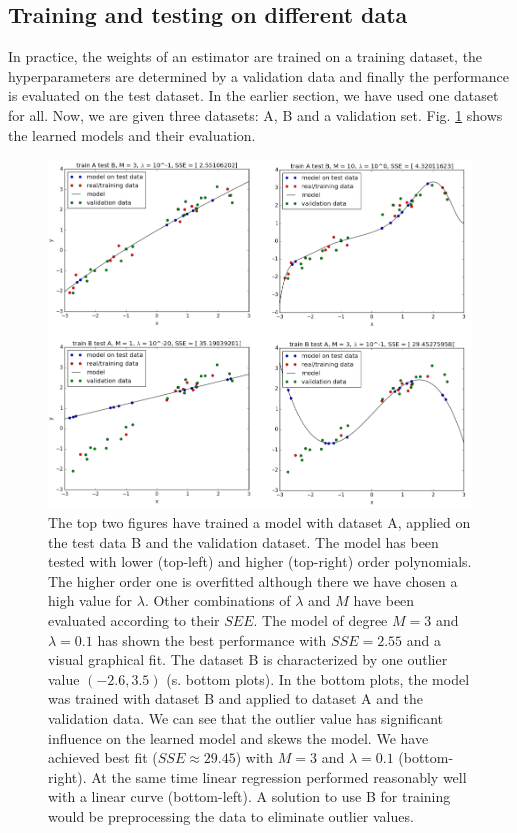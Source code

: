 \subsection{Training and testing on different data}
In practice, the weights of an estimator are trained on a training dataset, the hyperparameters are determined by a validation data and finally the performance is evaluated on the test dataset. In the earlier section, we have used one dataset for all. Now, we are given  three datasets: A, B and a validation set. Fig. \ref{trainABBA} shows the learned models and their evaluation.

\begin{figure}[!ht]
   \centering
   \includegraphics[width=1\linewidth]{figures/trainABBA}
   \caption{The top two figures have trained a model with dataset A, applied on the test data B and the validation dataset. The model has been tested with lower (top-left) and higher (top-right) order polynomials. The higher order one is overfitted although there we have chosen a high value for $\lambda$. Other combinations of $\lambda$ and $M$ have been evaluated according to their $SEE$. The model of degree $M=3$ and $\lambda = 0.1$ has shown the best performance with $SSE = 2.55$ and a visual graphical fit. The dataset B is characterized by one outlier value $(-2.6,3.5)$ (s. bottom plots). In the bottom plots, the model was trained with dataset B and applied to dataset A and the validation data. We can see that the outlier value has significant influence on the learned model and skews the model. We have achieved best fit ($SSE \approx 29.45$) with $M=3$ and $\lambda = 0.1$ (bottom-right). At the same time linear regression performed reasonably well with a linear curve (bottom-left). A solution to use B for training would be preprocessing the data to eliminate outlier values.}
\label{trainABBA}
\end{figure}

